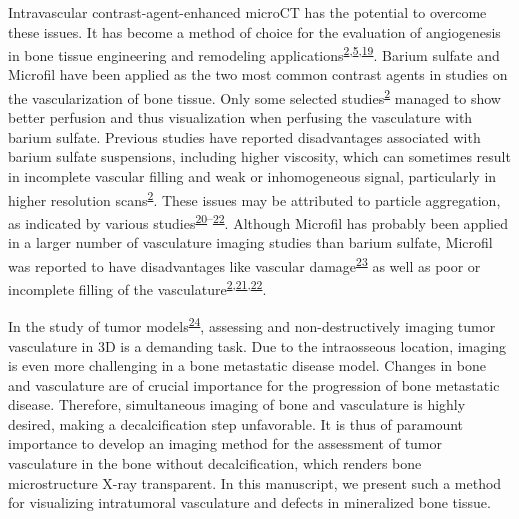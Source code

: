 Intravascular contrast-agent-enhanced microCT has the potential to overcome these issues.
It has become a method of choice for the evaluation of angiogenesis in bone tissue engineering and remodeling applications\textsuperscript{\protect\hyperlink{ref-AHsHFIUt}{2},\protect\hyperlink{ref-Vu36g0cK}{5},\protect\hyperlink{ref-13YRlKdu2}{19}}.
Barium sulfate and Microfil have been applied as the two most common contrast agents in studies on the vascularization of bone tissue.
Only some selected studies\textsuperscript{\protect\hyperlink{ref-AHsHFIUt}{2}} managed to show better perfusion and thus visualization when perfusing the vasculature with barium sulfate.
Previous studies have reported disadvantages associated with barium sulfate suspensions, including higher viscosity, which can sometimes result in incomplete vascular filling and weak or inhomogeneous signal, particularly in higher resolution scans\textsuperscript{\protect\hyperlink{ref-AHsHFIUt}{2}}.
These issues may be attributed to particle aggregation, as indicated by various studies\textsuperscript{\protect\hyperlink{ref-DWiXWNoA}{20}--\protect\hyperlink{ref-Ror9Uhfa}{22}}.
Although Microfil has probably been applied in a larger number of vasculature imaging studies than barium sulfate, Microfil was reported to have disadvantages like vascular damage\textsuperscript{\protect\hyperlink{ref-1A0HsmRho}{23}} as well as poor or incomplete filling of the vasculature\textsuperscript{\protect\hyperlink{ref-AHsHFIUt}{2},\protect\hyperlink{ref-KJUjdwi7}{21},\protect\hyperlink{ref-Ror9Uhfa}{22}}.

In the study of tumor models\textsuperscript{\protect\hyperlink{ref-cNoYNu8B}{24}}, assessing and non-destructively imaging tumor vasculature in 3D is a demanding task.
Due to the intraosseous location, imaging is even more challenging in a bone metastatic disease model.
Changes in bone and vasculature are of crucial importance for the progression of bone metastatic disease.
Therefore, simultaneous imaging of bone and vasculature is highly desired, making a decalcification step unfavorable.
It is thus of paramount importance to develop an imaging method for the assessment of tumor vasculature in the bone without decalcification, which renders bone microstructure X-ray transparent.
In this manuscript, we present such a method for visualizing intratumoral vasculature and defects in mineralized bone tissue.

